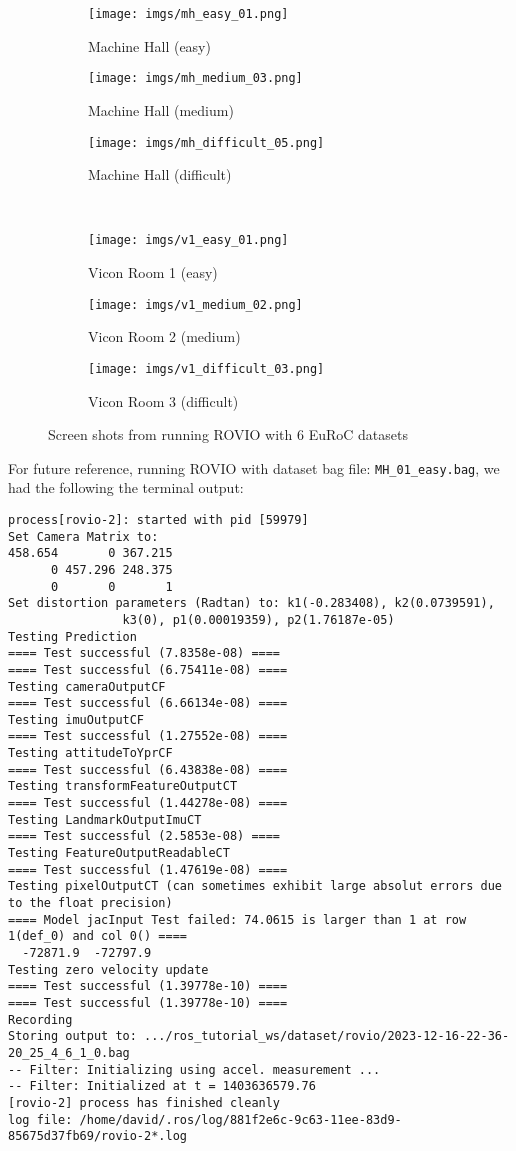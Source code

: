 \documentclass[11pt, oneside]{article}   	%
\begin{document}
\begin{figure}[ht]
\centering
\begin{subfigure}[b]{0.3\textwidth}
\texttt{[image: imgs/mh\_easy\_01.png]}
\caption{Machine Hall (easy)}
\end{subfigure}
\begin{subfigure}[b]{0.3\textwidth}
\texttt{[image: imgs/mh\_medium\_03.png]}
\caption{Machine Hall (medium)}
\end{subfigure}
\begin{subfigure}[b]{0.3\textwidth}
\texttt{[image: imgs/mh\_difficult\_05.png]}
\caption{Machine Hall (difficult)}
\end{subfigure}\\
\begin{subfigure}[b]{0.3\textwidth}
\texttt{[image: imgs/v1\_easy\_01.png]}
\caption{Vicon Room 1 (easy)}
\end{subfigure}
\begin{subfigure}[b]{0.3\textwidth}
\texttt{[image: imgs/v1\_medium\_02.png]}
\caption{Vicon Room 2 (medium)}
\end{subfigure}
\begin{subfigure}[b]{0.3\textwidth}
\texttt{[image: imgs/v1\_difficult\_03.png]}
\caption{Vicon Room 3 (difficult)}
\end{subfigure}
\caption{Screen shots from running ROVIO with 6 EuRoC datasets}
\label{fig.datasets}
\end{figure}


For future reference, running ROVIO with dataset bag file:
\verb+MH_01_easy.bag+, we had the following the terminal output:
\begin{verbatim}
process[rovio-2]: started with pid [59979]
Set Camera Matrix to:
458.654       0 367.215
      0 457.296 248.375
      0       0       1
Set distortion parameters (Radtan) to: k1(-0.283408), k2(0.0739591),
                k3(0), p1(0.00019359), p2(1.76187e-05)
Testing Prediction
==== Test successful (7.8358e-08) ====
==== Test successful (6.75411e-08) ====
Testing cameraOutputCF
==== Test successful (6.66134e-08) ====
Testing imuOutputCF
==== Test successful (1.27552e-08) ====
Testing attitudeToYprCF
==== Test successful (6.43838e-08) ====
Testing transformFeatureOutputCT
==== Test successful (1.44278e-08) ====
Testing LandmarkOutputImuCT
==== Test successful (2.5853e-08) ====
Testing FeatureOutputReadableCT
==== Test successful (1.47619e-08) ====
Testing pixelOutputCT (can sometimes exhibit large absolut errors due to the float precision)
==== Model jacInput Test failed: 74.0615 is larger than 1 at row 1(def_0) and col 0() ====
  -72871.9  -72797.9
Testing zero velocity update
==== Test successful (1.39778e-10) ====
==== Test successful (1.39778e-10) ====
Recording
Storing output to: .../ros_tutorial_ws/dataset/rovio/2023-12-16-22-36-20_25_4_6_1_0.bag
-- Filter: Initializing using accel. measurement ...
-- Filter: Initialized at t = 1403636579.76
[rovio-2] process has finished cleanly
log file: /home/david/.ros/log/881f2e6c-9c63-11ee-83d9-85675d37fb69/rovio-2*.log
\end{verbatim}
\end{document}

